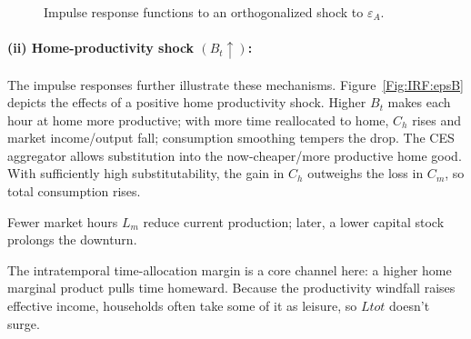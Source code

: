 \documentclass[a4paper,12pt]{article} %
\theoremstyle{nonitalic}
\begin{document}
\begin{figure}[H]
  \centering
  \hfill
  \caption{Impulse response functions to an orthogonalized shock to $\varepsilon_A$.}
  \label{Fig:IRF:epsA}
\end{figure}

\paragraph{(ii) Home-productivity shock $(B_t\uparrow)$:}

The impulse responses further illustrate these mechanisms.
Figure~\ref{Fig:IRF:epsB} depicts the effects of a positive home productivity shock.
Higher $B_t$ makes each hour at home more productive; with more time reallocated to home,
$C_h$ rises and market income/output fall; consumption smoothing tempers the drop.
The CES aggregator allows substitution into the now-cheaper/more productive home good. With sufficiently high substitutability,
the gain in $C_h$ outweighs the loss in $C_m$, so total consumption rises.

Fewer market hours $L_m$ reduce current production;
later, a lower capital stock prolongs the downturn.

The intratemporal time-allocation margin is a core channel here:
a higher home marginal product pulls time homeward.
Because the productivity windfall raises effective income,
households often take some of it as leisure, so $Ltot$ doesn't surge.
\end{document}

